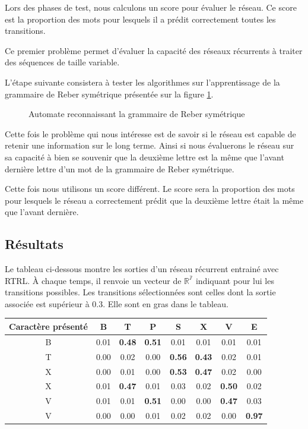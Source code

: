 Lors des phases de test, nous calculons un score pour évaluer le réseau. Ce score est la proportion des mots pour lesquels il a prédit correctement toutes les transitions.

Ce premier problème permet d'évaluer la capacité des réseaux récurrents à traiter des séquences de taille variable.

L'étape suivante consistera à tester les algorithmes sur l'apprentissage de la grammaire de Reber symétrique présentée sur la figure \ref{Grammaire de Reber symétrique}.  
\begin{figure}[h!]
\begin{center}

\caption{Automate reconnaissant la grammaire de Reber symétrique}
\label{Grammaire de Reber symétrique}
\end{center}
\end{figure}

Cette fois le problème qui nous intéresse est de savoir si le réseau est capable de retenir une information sur le long terme. Ainsi si nous évaluerons le réseau sur sa capacité à bien se souvenir que la deuxième lettre est la même que l'avant dernière lettre d'un mot de la grammaire de Reber symétrique.

Cette fois nous utilisons un score différent. Le score sera la proportion des mots pour lesquels le réseau a correctement prédit que la deuxième lettre était la même que l'avant dernière.

\subsection{Résultats}

Le tableau ci-dessous montre les sorties d'un réseau récurrent entrainé avec RTRL. À chaque temps, il renvoie un vecteur de $\mathbb{R^7}$ indiquant pour lui les transitions possibles. Les transitions sélectionnées sont celles dont la sortie associée est supérieur à $0.3$. Elle sont en gras dans le tableau.

\begin{center}
\begin{tabular}{|c|c|c|c|c|c|c|c|}
\hline
Caractère présenté & B & T & P & S & X & V & E \\
\hline
B & 0.01 & \textbf{0.48} & \textbf{0.51} & 0.01 & 0.01 & 0.01 & 0.01 \\
\hline
T & 0.00 & 0.02 & 0.00 & \textbf{0.56} &  \textbf{0.43} & 0.02 & 0.01 \\
\hline
X & 0.00 & 0.01 & 0.00 & \textbf{0.53} & \textbf{0.47} & 0.02 & 0.00 \\
\hline
X & 0.01 & \textbf{0.47} & 0.01 & 0.03 & 0.02 & \textbf{0.50} & 0.02 \\
\hline
V & 0.01 & 0.01 & \textbf{0.51} & 0.00 & 0.00 & \textbf{0.47} & 0.03 \\
\hline
V & 0.00 & 0.00 & 0.01 & 0.02 & 0.02 & 0.00 & \textbf{0.97} \\
\hline
\end{tabular}
\end{center}

